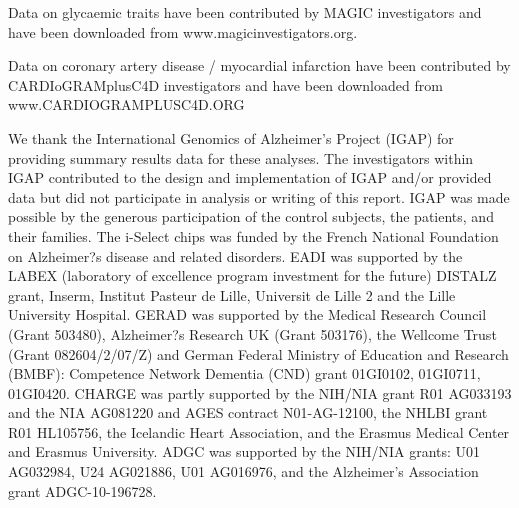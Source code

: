 \documentclass[11pt,titlepage]{article}
\begin{document}
Data on glycaemic traits have been contributed by MAGIC investigators and have been downloaded from www.magicinvestigators.org.

Data on coronary artery disease / myocardial infarction have been contributed by CARDIoGRAMplusC4D investigators and have been downloaded from www.CARDIOGRAMPLUSC4D.ORG

We thank the International Genomics of Alzheimer's Project (IGAP) for providing summary results data for these analyses. The investigators within IGAP contributed to the design and implementation of IGAP and/or provided data but did not participate in analysis or writing of this report. IGAP was made possible by the generous participation of the control subjects, the patients, and their families. The i-Select chips was funded by the French National Foundation on Alzheimer?s disease and related disorders. EADI was supported by the LABEX (laboratory of excellence program investment for the future) DISTALZ grant, Inserm, Institut Pasteur de Lille, Universit de Lille 2 and the Lille University Hospital. GERAD was supported by the Medical Research Council (Grant 503480), Alzheimer?s Research UK (Grant 503176), the Wellcome Trust (Grant 082604/2/07/Z) and German Federal Ministry of Education and Research (BMBF): Competence Network Dementia
(CND) grant 01GI0102, 01GI0711, 01GI0420. CHARGE was partly supported by the NIH/NIA grant R01 AG033193 and the NIA AG081220 and AGES contract N01-AG-12100, the NHLBI grant R01 HL105756, the Icelandic Heart Association, and the Erasmus Medical Center and Erasmus University. ADGC was supported by the NIH/NIA grants: U01 AG032984, U24 AG021886, U01 AG016976, and the Alzheimer's Association grant ADGC-10-196728.


\end{document}

